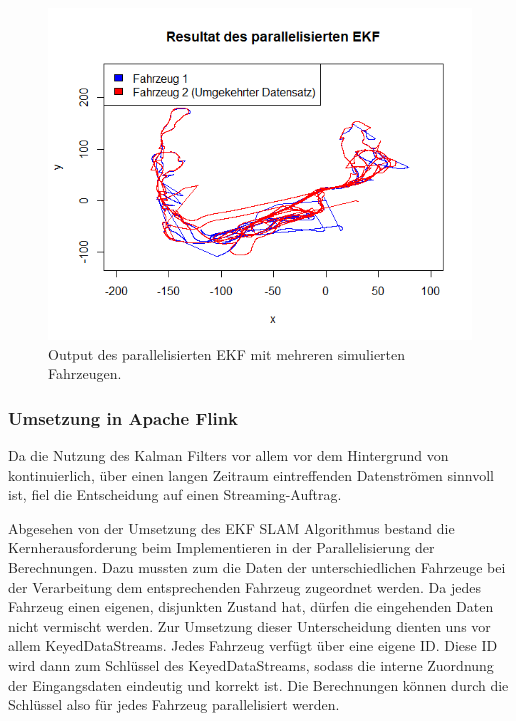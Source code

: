 \documentclass[11pt]{article}
\begin{document}
\begin{figure}[H]
	\centering
	\includegraphics[width=5in]{EKF-output-parallel.png}
	\caption{Output des parallelisierten EKF mit mehreren simulierten Fahrzeugen.}
	\label{EKF-Output-Parallel}
\end{figure}

\subsubsection{Umsetzung in Apache Flink}
Da die Nutzung des Kalman Filters vor allem vor dem Hintergrund von kontinuierlich, über einen langen Zeitraum eintreffenden Datenströmen sinnvoll ist, fiel die Entscheidung auf einen Streaming-Auftrag.

Abgesehen von der Umsetzung des EKF SLAM Algorithmus bestand die Kernherausforderung beim Implementieren in der Parallelisierung der Berechnungen. Dazu mussten zum die Daten der unterschiedlichen Fahrzeuge bei der Verarbeitung dem entsprechenden Fahrzeug zugeordnet werden. Da jedes Fahrzeug einen eigenen, disjunkten Zustand hat, dürfen die eingehenden Daten nicht vermischt werden. Zur Umsetzung dieser Unterscheidung dienten uns vor allem KeyedDataStreams. Jedes Fahrzeug verfügt über eine eigene ID. Diese ID wird dann zum Schlüssel des KeyedDataStreams, sodass die interne Zuordnung der Eingangsdaten eindeutig und korrekt ist. Die Berechnungen können durch die Schlüssel also für jedes Fahrzeug parallelisiert werden.
\end{document}
